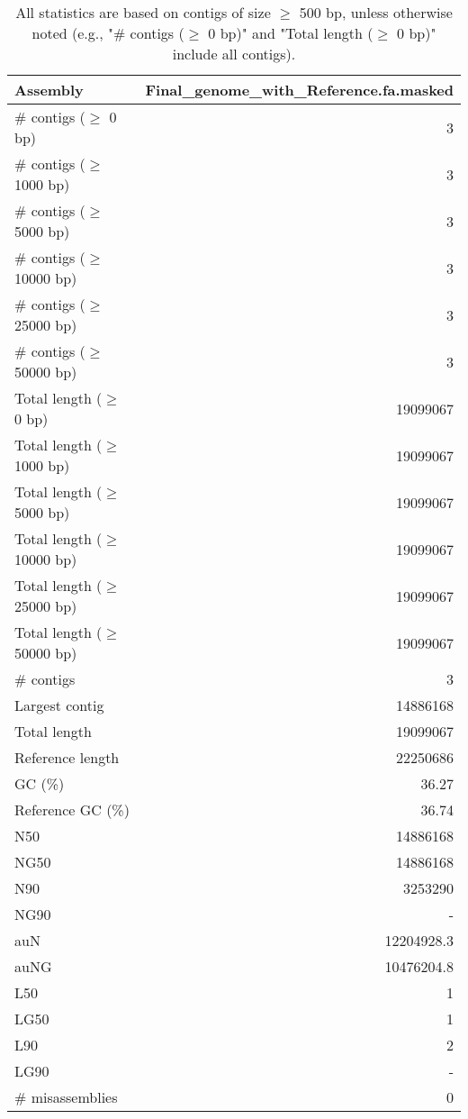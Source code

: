 \documentclass[12pt,a4paper]{article}
\begin{document}
\begin{table}[ht]
\begin{center}
\caption{All statistics are based on contigs of size $\geq$ 500 bp, unless otherwise noted (e.g., "\# contigs ($\geq$ 0 bp)" and "Total length ($\geq$ 0 bp)" include all contigs).}
\begin{tabular}{|l*{1}{|r}|}
\hline
Assembly & Final\_genome\_with\_Reference.fa.masked \\ \hline
\# contigs ($\geq$ 0 bp) & 3 \\ \hline
\# contigs ($\geq$ 1000 bp) & 3 \\ \hline
\# contigs ($\geq$ 5000 bp) & 3 \\ \hline
\# contigs ($\geq$ 10000 bp) & 3 \\ \hline
\# contigs ($\geq$ 25000 bp) & 3 \\ \hline
\# contigs ($\geq$ 50000 bp) & 3 \\ \hline
Total length ($\geq$ 0 bp) & 19099067 \\ \hline
Total length ($\geq$ 1000 bp) & 19099067 \\ \hline
Total length ($\geq$ 5000 bp) & 19099067 \\ \hline
Total length ($\geq$ 10000 bp) & 19099067 \\ \hline
Total length ($\geq$ 25000 bp) & 19099067 \\ \hline
Total length ($\geq$ 50000 bp) & 19099067 \\ \hline
\# contigs & 3 \\ \hline
Largest contig & 14886168 \\ \hline
Total length & 19099067 \\ \hline
Reference length & 22250686 \\ \hline
GC (\%) & 36.27 \\ \hline
Reference GC (\%) & 36.74 \\ \hline
N50 & 14886168 \\ \hline
NG50 & 14886168 \\ \hline
N90 & 3253290 \\ \hline
NG90 & - \\ \hline
auN & 12204928.3 \\ \hline
auNG & 10476204.8 \\ \hline
L50 & 1 \\ \hline
LG50 & 1 \\ \hline
L90 & 2 \\ \hline
LG90 & - \\ \hline
\# misassemblies & 0 \\ \hline

\end{tabular}
\end{center}
\end{table}
\end{document}
